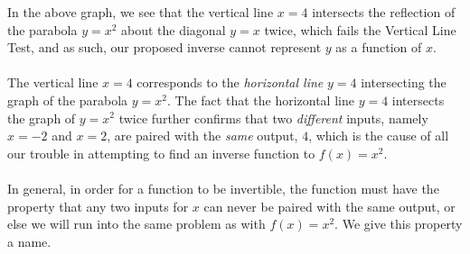 \documentclass[11pt]{book}
\theoremstyle{definition}  %
\begin{document}
\begin{center}
\end{center}

In the above graph, we see that the vertical line $x=4$ intersects the reflection of the parabola $y=x^2$ about the diagonal $y=x$ twice, which fails the Vertical Line Test, and as such, our proposed inverse cannot represent $y$ as a function of $x$.\\
~\\
The vertical line $x=4$ corresponds to the \textit{horizontal line} $y=4$ intersecting the graph of the parabola $y=x^2$.  The fact that the horizontal line $y=4$ intersects the graph of $y=x^2$ twice further confirms that two \textit{different} inputs, namely $x=-2$ and $x=2$, are paired with the \textit{same} output, $4$, which is the cause of all our trouble in attempting to find an inverse function to $f(x)=x^2$.\\
~\\
In general, in order for a function to be invertible, the function must have the property that any two inputs for $x$ can never be paired with the same output, or else we will run into the same problem as with $f(x) = x^2$.  We give this property a name.\\
\end{document}
